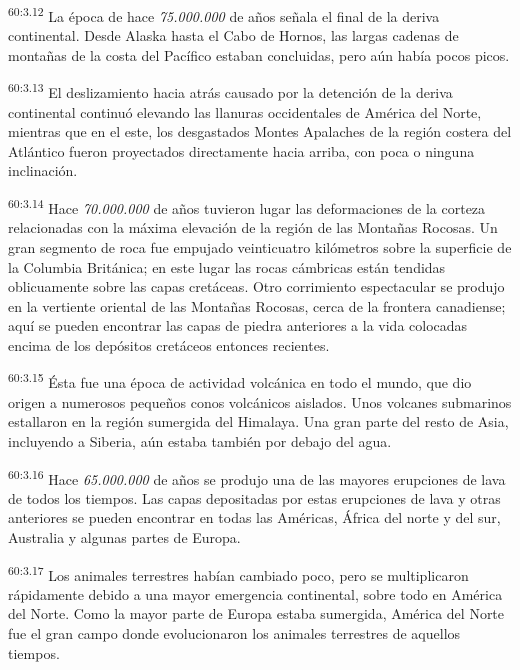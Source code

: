 \par
\textsuperscript{60:3.12} La época de hace \textit{75.000.000} de años señala el final de la deriva continental. Desde Alaska hasta el Cabo de Hornos, las largas cadenas de montañas de la costa del Pacífico estaban concluidas, pero aún había pocos picos.

\par
\textsuperscript{60:3.13} El deslizamiento hacia atrás causado por la detención de la deriva continental continuó elevando las llanuras occidentales de América del Norte, mientras que en el este, los desgastados Montes Apalaches de la región costera del Atlántico fueron proyectados directamente hacia arriba, con poca o ninguna inclinación.

\par
\textsuperscript{60:3.14} Hace \textit{70.000.000} de años tuvieron lugar las deformaciones de la corteza relacionadas con la máxima elevación de la región de las Montañas Rocosas. Un gran segmento de roca fue empujado veinticuatro kilómetros sobre la superficie de la Columbia Británica; en este lugar las rocas cámbricas están tendidas oblicuamente sobre las capas cretáceas. Otro corrimiento espectacular se produjo en la vertiente oriental de las Montañas Rocosas, cerca de la frontera canadiense; aquí se pueden encontrar las capas de piedra anteriores a la vida colocadas encima de los depósitos cretáceos entonces recientes.

\par
\textsuperscript{60:3.15} Ésta fue una época de actividad volcánica en todo el mundo, que dio origen a numerosos pequeños conos volcánicos aislados. Unos volcanes submarinos estallaron en la región sumergida del Himalaya. Una gran parte del resto de Asia, incluyendo a Siberia, aún estaba también por debajo del agua.

\par
\textsuperscript{60:3.16} Hace \textit{65.000.000} de años se produjo una de las mayores erupciones de lava de todos los tiempos. Las capas depositadas por estas erupciones de lava y otras anteriores se pueden encontrar en todas las Américas, África del norte y del sur, Australia y algunas partes de Europa.

\par
\textsuperscript{60:3.17} Los animales terrestres habían cambiado poco, pero se multiplicaron rápidamente debido a una mayor emergencia continental, sobre todo en América del Norte. Como la mayor parte de Europa estaba sumergida, América del Norte fue el gran campo donde evolucionaron los animales terrestres de aquellos tiempos.

